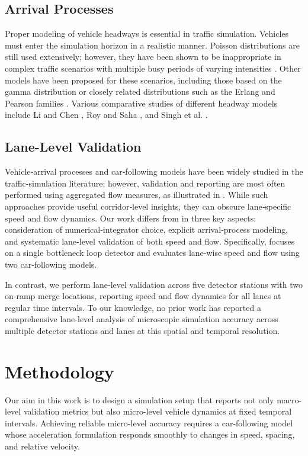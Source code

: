 \documentclass{scspaperproc}
\theoremstyle{scsthe}
\begin{document}
\subsection{Arrival Processes}
Proper modeling of vehicle headways is essential in traffic simulation. Vehicles must enter the simulation horizon
in a realistic manner. Poisson distributions are still used extensively; however, they have been shown to be inappropriate in complex traffic scenarios with multiple busy periods of varying intensities \cite{meng2009self}.
Other models have been proposed for these scenarios, including those based on the gamma distribution or closely
related distributions such as the Erlang and Pearson families \cite{li2017vehicle}. Various comparative studies of
different headway models include Li and Chen \cite{li2017vehicle}, Roy and Saha \cite{roy2018headway}, and Singh et
al. \cite{singh2020multivariate}.

\subsection{Lane-Level Validation}
Vehicle‑arrival processes and car‑following models have been widely studied in the
traffic‑simulation literature; however, validation and reporting are most often performed using aggregated flow
measures, as illustrated in \cite{11118854}. While such approaches provide useful corridor‑level insights, they can obscure lane‑specific speed and flow dynamics. Our work differs from \cite{11118854} in three key aspects: consideration of numerical‑integrator choice, explicit arrival‑process modeling, and systematic lane‑level validation of both speed and flow. Specifically, \cite{11118854} focuses on a single bottleneck loop detector and evaluates lane‑wise speed and flow using two car‑following models.

In contrast, we perform lane‑level validation across five detector stations with two on‑ramp merge locations, reporting speed and flow dynamics for all lanes at regular time intervals. To our knowledge, no prior work has reported a comprehensive lane-level analysis of microscopic simulation accuracy across multiple detector stations and lanes at this spatial and temporal resolution.

\section{Methodology}
\label{sec:methodology}
Our aim in this work is to design a simulation setup that reports not only macro-level validation metrics but also micro-level vehicle dynamics at fixed temporal intervals. Achieving reliable micro-level accuracy requires
a car-following model whose acceleration formulation responds smoothly to changes in speed, spacing, and relative velocity.
\end{document}
